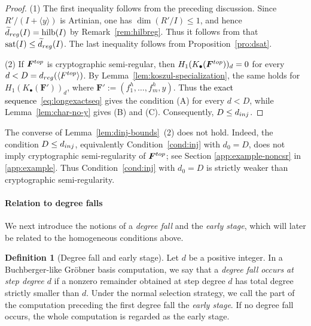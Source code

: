 \documentclass{article}
\theoremstyle{definition}
\newtheorem{definition}[theorem]{Definition}
\theoremstyle{plain}
\theoremstyle{plain}
\theoremstyle{plain}
\theoremstyle{plain}
\numberwithin{equation}{subsection}
\begin{document}
\begin{proof}
    (1) The first inequality follows from the preceding discussion.
    Since $R'/(I+\langle y\rangle)$ is Artinian, one has $\dim(R'/I)\le1$, and hence $\widetilde d_{\rm reg}(I)=\operatorname{hilb}(I)$ by Remark~\ref{rem:hilbreg}.
    Thus it follows from \cite[Lemma~5.6]{Hashemi2010} that $\operatorname{sat}(I)\le \widetilde d_{\rm reg}(I)$.
    The last inequality follows from Proposition~\ref{pro:dsat}.

    (2) If $\bm F^{\rm top}$ is cryptographic semi-regular, then $H_1(K_\bullet(\bm F^{\rm top}))_d=0$ for every $d<D=d_{\rm reg}(\langle F^{\rm top}\rangle)$.
    By Lemma~\ref{lem:koszul-specialization}, the same holds for $H_1(K_\bullet(\bm F'))_d$, where $\bm{F}':=(f_1^h,\ldots,f_m^h,y)$.
    Thus \textcolor{black}{the exact sequence}~\eqref{eq:longexactseq} gives the condition {\rm (A)} for every $d<D$, while Lemma~\ref{lem:char-no-y} gives {\rm (B)} and {\rm (C)}.
    Consequently, $D\leq d_{\rm inj}$.
\end{proof}

The converse of Lemma~\ref{lem:dinj-bounds}~{\rm (2)} does not hold.
Indeed, the condition $D\le d_{\rm inj}$, equivalently Condition~\ref{cond:inj} with $d_0=D$, does not imply cryptographic semi-regularity of $\bm F^{\rm top}$;
see Section \ref{app:example-noncsr} in \ref{app:example}.
Thus Condition~\ref{cond:inj} with $d_0=D$ is strictly weaker than cryptographic semi-regularity.

\paragraph{Relation to degree falls}

We next introduce the notions of a \emph{degree fall} and the \emph{early stage}, which will later be related to the homogeneous conditions above.

\begin{definition}[Degree fall and early stage]\label{def:degfall}
Let $d$ be a positive integer.
In a Buchberger-like Gr\"obner basis computation, we say that a \emph{degree fall occurs at step degree $d$} if a nonzero remainder obtained at step degree $d$ has total degree strictly smaller than $d$.
Under the normal selection strategy, we call the part of the computation preceding the first degree fall the \emph{early stage}.
If no degree fall occurs, the whole computation is regarded as the early stage.
\end{definition}
\end{document}
